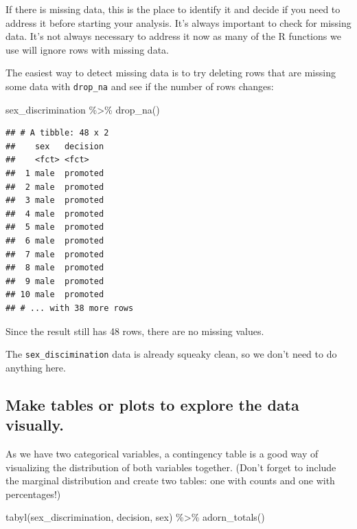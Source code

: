 \documentclass[
]{book}
\newenvironment{Shaded}{\begin{snugshade}}{\end{snugshade}}
\newcommand{\FunctionTok}[1]{\textcolor[rgb]{0.00,0.00,0.00}{#1}}
\newcommand{\NormalTok}[1]{#1}
\newcommand{\SpecialCharTok}[1]{\textcolor[rgb]{0.00,0.00,0.00}{#1}}
\begin{document}
If there is missing data, this is the place to identify it and decide if you need to address it before starting your analysis. It's always important to check for missing data. It's not always necessary to address it now as many of the R functions we use will ignore rows with missing data.

The easiest way to detect missing data is to try deleting rows that are missing some data with \texttt{drop\_na} and see if the number of rows changes:

\begin{Shaded}
\begin{Highlighting}[]
\NormalTok{sex\_discrimination }\SpecialCharTok{\%\textgreater{}\%}
  \FunctionTok{drop\_na}\NormalTok{()}
\end{Highlighting}
\end{Shaded}

\begin{verbatim}
## # A tibble: 48 x 2
##    sex   decision
##    <fct> <fct>   
##  1 male  promoted
##  2 male  promoted
##  3 male  promoted
##  4 male  promoted
##  5 male  promoted
##  6 male  promoted
##  7 male  promoted
##  8 male  promoted
##  9 male  promoted
## 10 male  promoted
## # ... with 38 more rows
\end{verbatim}

Since the result still has 48 rows, there are no missing values.

The \texttt{sex\_discimination} data is already squeaky clean, so we don't need to do anything here.

\hypertarget{hypothesis1-ex-plots}{%
\subsection{Make tables or plots to explore the data visually.}\label{hypothesis1-ex-plots}}

As we have two categorical variables, a contingency table is a good way of visualizing the distribution of both variables together. (Don't forget to include the marginal distribution and create two tables: one with counts and one with percentages!)

\begin{Shaded}
\begin{Highlighting}[]
\FunctionTok{tabyl}\NormalTok{(sex\_discrimination, decision, sex) }\SpecialCharTok{\%\textgreater{}\%}
  \FunctionTok{adorn\_totals}\NormalTok{()}
\end{Highlighting}
\end{Shaded}
\end{document}
